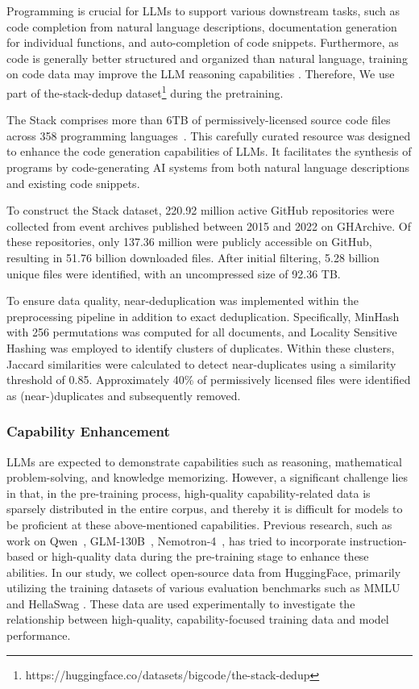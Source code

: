 Programming is crucial for LLMs to support various downstream tasks, such as code completion from natural language descriptions, documentation generation for individual functions, and auto-completion of code snippets. Furthermore, as code is generally better structured and organized than natural language, training on code data may improve the LLM reasoning capabilities \cite{groeneveld2024olmo}. Therefore, We use part of the-stack-dedup \cite{kocetkov2022stack} dataset\footnote{https://huggingface.co/datasets/bigcode/the-stack-dedup} during the pretraining.

The Stack comprises more than 6TB of permissively-licensed source code files across 358 programming languages~\cite{kocetkov2022stack}. This carefully curated resource was designed to enhance the code generation capabilities of LLMs. It facilitates the synthesis of programs by code-generating AI systems from both natural language descriptions and existing code snippets.


To construct the Stack dataset, 220.92 million active GitHub repositories were collected from event archives published between 2015 and 2022 on GHArchive. Of these repositories, only 137.36 million were publicly accessible on GitHub, resulting in 51.76 billion downloaded files. After initial filtering, 5.28 billion unique files were identified, with an uncompressed size of 92.36 TB.



To ensure data quality, near-deduplication was implemented within the preprocessing pipeline in addition to exact deduplication. Specifically, MinHash with 256 permutations was computed for all documents, and Locality Sensitive Hashing was employed to identify clusters of duplicates. Within these clusters, Jaccard similarities were calculated to detect near-duplicates using a similarity threshold of 0.85. Approximately 40\% of permissively licensed files were identified as (near-)duplicates and subsequently removed.




\subsubsection{Capability Enhancement}

LLMs are expected to demonstrate capabilities such as reasoning, mathematical problem-solving, and knowledge memorizing. However, a significant challenge lies in that, in the pre-training process, high-quality capability-related data is sparsely distributed in the entire corpus, and thereby it is difficult for models to be proficient at these above-mentioned capabilities. Previous research, such as work on Qwen~\cite{bai2023qwen}, GLM-130B~\cite{zeng2023glmb}, Nemotron-4~\cite{parmar2024nemotron}, has tried to incorporate instruction-based or high-quality data during the pre-training stage to enhance these abilities. In our study, we collect open-source data from HuggingFace, primarily utilizing the training datasets of various evaluation benchmarks such as MMLU \cite{hendrycks2021measuringmassivemultitasklanguage} and HellaSwag \cite{zellers2019hellaswag}. These data are used experimentally to investigate the relationship between high-quality, capability-focused training data and model performance.


